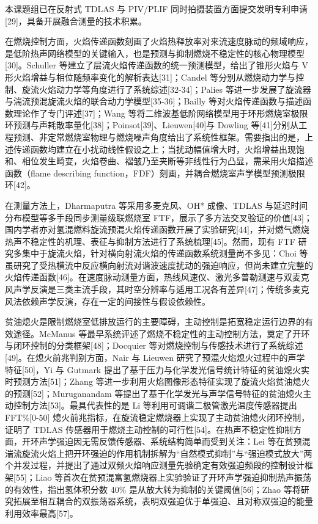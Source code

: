 \documentclass[UTF8,a4paper,zihao=-4,fontset=windows]{ctexart}
\begin{document}
本课题组已在反射式 TDLAS 与 PIV/PLIF 同时拍摄装置方面提交发明专利申请[29]，具备开展融合测量的技术积累。

在燃烧控制方面，火焰传递函数刻画了火焰热释放率对来流速度脉动的频域响应，是低阶热声网络模型的关键输入，也是预测与抑制燃烧不稳定性的核心物理模型[30]。Schuller 等建立了层流火焰传递函数的统一预测模型，给出了锥形火焰与 V 形火焰增益与相位随频率变化的解析表达[31]；Candel 等分别从燃烧动力学与控制、旋流火焰动力学等角度进行了系统综述[32-34]；Palies 等进一步发展了旋流器与湍流预混旋流火焰的联合动力学模型[35-36]；Bailly 等对火焰传递函数与描述函数理论作了专门评述[37]；Wang 等将二维波基低阶网络模型用于环形燃烧室极限环预测与声耗散率量化[38]；Poinsot[39]、Lieuwen[40]与 Dowling 等[41]分别从工程预测、非定常燃烧室物理与燃烧噪声角度给出了系统性框架。需要指出的是，上述传递函数均建立在小扰动线性假设之上；当扰动幅值增大时，火焰增益出现饱和、相位发生畸变，火焰卷曲、褶皱乃至夹断等非线性行为凸显，需采用火焰描述函数（flame describing function，FDF）刻画，并耦合燃烧室声学模型预测极限环[42]。

在测量方法上，Dharmaputra 等采用多麦克风、OH* 成像、TDLAS 与延迟时间分布模型等多手段同步测量级联燃烧室 FTF，展示了多方法交叉验证的价值[43]；国内学者亦对氢混燃料旋流预混火焰传递函数开展了实验研究[44]，并对燃气燃烧热声不稳定性的机理、表征与抑制方法进行了系统梳理[45]。然而，现有 FTF 研究多集中于旋流火焰，针对横向射流火焰的传递函数系统测量尚不多见：Choi 等虽研究了受热横流中反应横向射流对谐波速度扰动的强迫响应，但尚未建立完整的火焰传递函数[46]。在速度脉动测量方面，热线风速仪、激光多普勒测速与双麦克风声学反演是三类主流手段，其时空分辨率与适用工况各有差异[47]；传统多麦克风法依赖声学反演，存在一定的间接性与假设依赖性。

贫油熄火是限制燃烧室低排放运行的主要障碍，主动控制是拓宽稳定运行边界的有效途径。McManus 等最早系统评述了燃烧不稳定性的主动控制方法，奠定了开环与闭环控制的分类框架[48]；Docquier 等对燃烧控制与传感技术进行了系统综述[49]。在熄火前兆判别方面，Nair 与 Lieuwen 研究了预混火焰熄火过程中的声学特征[50]，Yi 与 Gutmark 提出了基于压力与化学发光信号统计特征的贫油熄火实时预测方法[51]；Zhang 等进一步利用火焰图像形态特征实现了旋流火焰贫油熄火的预测[52]；Muruganandam 等提出了基于化学发光与声学信号特征的贫油熄火主动控制方法[53]。最具代表性的是 Li 等利用可调谐二极管激光温度传感器提出 FFT\%[0-50] 熄火前兆指标，在旋流稳定燃烧器上实现了主动贫油熄火闭环控制，证明了 TDLAS 传感器用于燃烧主动控制的可行性[54]。在热声不稳定性抑制方面，开环声学强迫因无需反馈传感器、系统结构简单而受到关注：Lei 等在贫预混湍流旋流火焰上把开环强迫的作用机制拆解为“自然模式抑制”与“强迫模式放大”两个并发过程，并提出了通过双频火焰响应测量先验确定有效强迫频段的控制设计框架[55]；Liao 等首次在贫预混富氢燃烧器上实验验证了开环声学强迫抑制热声振荡的有效性，指出氢体积分数 40\% 是从放大转为抑制的关键阈值[56]；Zhao 等将研究拓展至相互耦合的双振荡器系统，表明双强迫优于单强迫、且对称双强迫的能量利用效率最高[57]。
\end{document}
